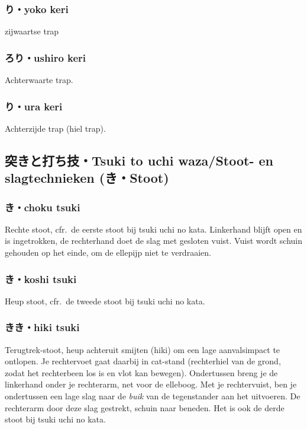 \subsubsection{り・yoko keri}
zijwaartse trap

\subsubsection{ろり・ushiro keri}
Achterwaarte trap.

\subsubsection{り・ura keri}
Achterzijde trap (hiel trap).

\subsection{突きと打ち技・Tsuki to uchi waza/Stoot- en slagtechnieken ({\bfseries{}き・Stoot})}
\subsubsection{き・choku tsuki}
Rechte stoot, cfr.\ de eerste stoot bij tsuki uchi no kata. Linkerhand blijft open en is ingetrokken, de rechterhand doet de slag met gesloten vuist. Vuist wordt schuin gehouden op het einde, om de ellepijp niet te verdraaien.

\subsubsection{き・koshi tsuki}
Heup stoot, cfr.\ de tweede stoot bij tsuki uchi no kata.

\subsubsection{きき・hiki tsuki}
Terugtrek-stoot, heup achteruit smijten (hiki) om een lage aanvalsimpact te ontlopen. Je rechtervoet gaat daarbij in cat-stand (rechterhiel van de grond, zodat het rechterbeen los is en vlot kan bewegen). Ondertussen breng je de linkerhand onder je rechterarm, net voor de elleboog. Met je rechtervuist, ben je ondertussen een lage slag naar de \textit{buik} van de tegenstander aan het uitvoeren. De rechterarm door deze slag gestrekt, schuin naar beneden. Het is ook de derde stoot bij tsuki uchi no kata.

